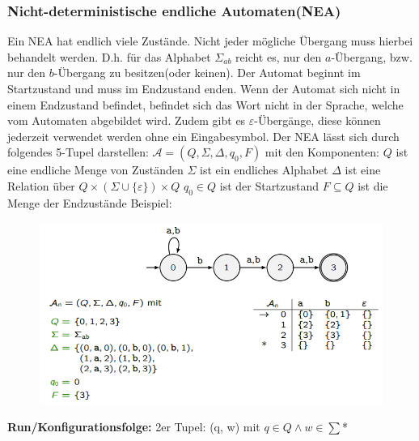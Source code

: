 \documentclass[12pt,a4paper]{article}
\begin{document}
	\subsubsection{Nicht-deterministische endliche Automaten(NEA)}
	Ein NEA hat endlich viele Zustände. Nicht jeder mögliche Übergang muss hierbei behandelt werden. D.h. für das Alphabet $\varSigma_{ab}$ reicht es, nur den $a$-Übergang, bzw. nur den $b$-Übergang zu besitzen(oder keinen). Der Automat beginnt im Startzustand und muss im Endzustand enden. Wenn der Automat sich nicht in einem Endzustand befindet, befindet sich das Wort nicht in der Sprache, welche vom Automaten abgebildet wird. Zudem gibt es $\varepsilon$-Übergänge, diese können jederzeit verwendet werden ohne ein Eingabesymbol.\newline
	\noindent Der NEA lässt sich durch folgendes 5-Tupel darstellen:\newline
	$\mathcal{A} = (Q, \varSigma, \Delta , q_0, F)$ mit den Komponenten:\newline
	$Q$ ist eine endliche Menge von Zuständen\newline
	$\varSigma$ ist ein endliches Alphabet\newline
	$\Delta$ ist eine Relation über $Q \times (\varSigma \cup \{\varepsilon\}) \times Q$\newline
	$q_0 \in Q$ ist der Startzustand\newline
	$F \subseteq Q$ ist die Menge der Endzustände\newline
	\newline
	Beispiel:\newline
	\begin{center}
		\begin{figure}[!h]
			\includegraphics[width=\textwidth]{Bilder/NEA_Beispiel.png}
		\end{figure}
	\end{center}
	\textbf{Run/Konfigurationsfolge: } 2er Tupel: (q, w) mit $q \in Q \wedge w \in \sum$*
	
\end{document}
